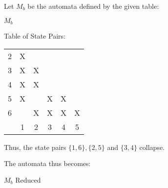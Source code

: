 Let $M_b$ be the automata defined by the given table:
\begin{automata}{$M_b$}
	
	
	
	
	
	
	
	
\end{automata}

Table of State Pairs: \\
\begin{center} \begin{tabular}{*{6}{c|}}
									\cline{1-2}
	2 & X						\\	\cline{1-3}
	3 & X & X					\\	\cline{1-4}
	4 & X & X &  				\\	\cline{1-5}
	5 & X &   & X & X			\\	\cline{1-6}
	6 &   & X & X & X & X		\\	\hline
	  & 1 & 2 & 3 & 4 & 5		\\
\end{tabular} \end{center}

Thus, the state pairs $\{1,6\}, \{2,5\}$ and $\{3,4\}$ collapse.

The automata thus becomes:
\begin{automata}{$M_b$ Reduced}
	
	
	
	
\end{automata}